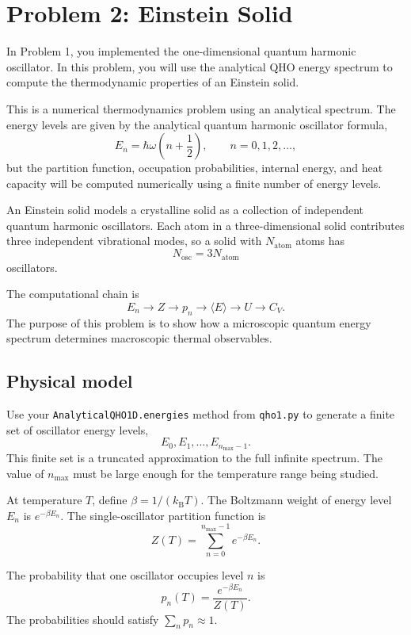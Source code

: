 \section{Problem 2: Einstein Solid}

In Problem 1, you implemented the one-dimensional quantum harmonic oscillator. In this problem, you will use the analytical QHO energy spectrum to compute the thermodynamic properties of an Einstein solid.

This is a numerical thermodynamics problem using an analytical spectrum. The energy levels are given by the analytical quantum harmonic oscillator formula,
\[
E_n=\hbar\omega\left(n+\frac12\right),
\qquad n=0,1,2,\ldots,
\]
but the partition function, occupation probabilities, internal energy, and heat capacity will be computed numerically using a finite number of energy levels.

An Einstein solid models a crystalline solid as a collection of independent quantum harmonic oscillators. Each atom in a three-dimensional solid contributes three independent vibrational modes, so a solid with \(N_{\mathrm{atom}}\) atoms has
\[
N_{\mathrm{osc}}=3N_{\mathrm{atom}}
\]
oscillators.

The computational chain is
\[
E_n
\longrightarrow
Z
\longrightarrow
p_n
\longrightarrow
\langle E\rangle
\longrightarrow
U
\longrightarrow
C_V.
\]
The purpose of this problem is to show how a microscopic quantum energy spectrum determines macroscopic thermal observables.

\subsection{Physical model}

Use your \texttt{AnalyticalQHO1D.energies} method from \texttt{qho1.py} to generate a finite set of oscillator energy levels,
\[
E_0,E_1,\ldots,E_{n_{\max}-1}.
\]
This finite set is a truncated approximation to the full infinite spectrum. The value of \(n_{\max}\) must be large enough for the temperature range being studied.

At temperature \(T\), define \(\beta=1/(k_{\mathrm B}T)\). The Boltzmann weight of energy level \(E_n\) is \(e^{-\beta E_n}\). The single-oscillator partition function is
\[
Z(T)=\sum_{n=0}^{n_{\max}-1}e^{-\beta E_n}.
\]

The probability that one oscillator occupies level \(n\) is
\[
p_n(T)=\frac{e^{-\beta E_n}}{Z(T)}.
\]
The probabilities should satisfy \(\sum_n p_n\approx1\).

